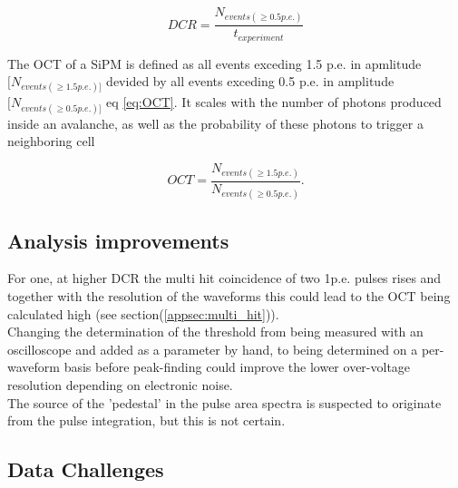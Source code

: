\documentclass[12pt,article,type=msc,colorback,accentcolor=tud9c]{tudthesis}
\begin{document}
\begin{equation}\label{eq:DCR_eq}
DCR = \frac{N_{events(\geq 0.5p.e.)}}{t_{experiment}}
\end{equation}


The OCT of a SiPM is defined as all events exceding 1.5 p.e. in apmlitude$[N_{events(\geq 1.5p.e.)]}$ devided by all events exceding 0.5 p.e. in amplitude$[N_{events(\geq 0.5p.e.)]}$ eq \ref{eq:OCT}. It scales with the number of photons produced inside an avalanche, as well as the probability of these photons to trigger a neighboring cell

\begin{equation}\label{eq:OCT}
OCT = \frac{N_{events(\geq 1.5p.e.)}}{N_{events(\geq 0.5p.e.)}}.
\end{equation}

\subsection{Analysis improvements}
For one, at higher DCR the multi hit coincidence of two 1p.e. pulses rises and together with the resolution of the waveforms this could lead to the OCT being calculated high (see section(\ref{appsec:multi_hit})).\\ Changing the determination of the threshold from being measured with an oscilloscope and added as a parameter by hand, to being determined on a per-waveform basis before peak-finding could improve the lower over-voltage resolution depending on electronic noise.\\ The source of the 'pedestal' in the pulse area spectra is suspected to originate from the pulse integration, but this is not certain.


\newpage
\subsection{Data Challenges}
\label{subsec:data_challenges}
\end{document}
